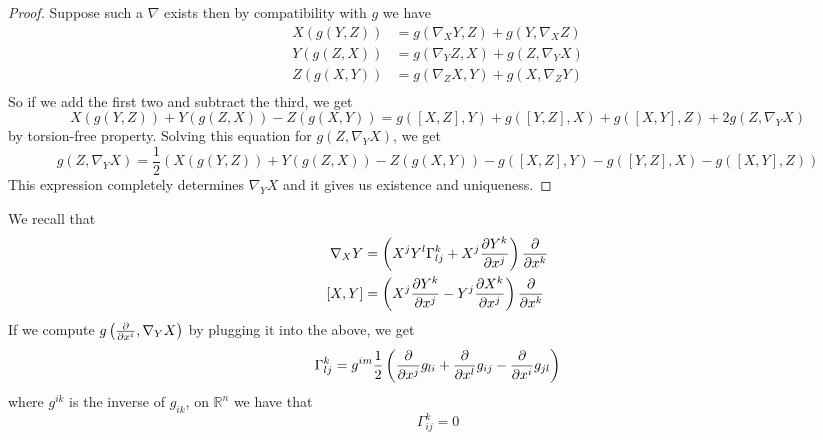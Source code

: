 \documentclass[a4paper]{article}
\begin{document}
\begin{proof}
  Suppose such a $\nabla$ exists then by compatibility with $g$ we have 
  \[
    \begin{aligned}
      X \left( g \left( Y, Z \right) \right) &= g \left( \nabla_X Y, Z \right) + g \left( Y, \nabla_X Z \right) \\
      Y \left( g \left( Z, X \right) \right) &= g \left( \nabla_Y Z, X \right) + g \left( Z, \nabla_Y X \right) \\
      Z \left( g \left( X, Y \right) \right) &= g \left( \nabla_Z X, Y \right) + g \left( X, \nabla_Z Y \right) \\
    \end{aligned}
  \]
  So if we add the first two and subtract the third, we get
  \[
    X(g(Y,Z)) + Y(g(Z,X)) - Z(g(X,Y)) = g([X,Z], Y) + g([Y,Z], X) + g([X,Y],Z) + 2 g (Z, \nabla_Y X)
  \]
  by torsion-free property. Solving this equation for $g(Z, \nabla_Y X)$, we get 
  \[
    g(Z, \nabla_Y X) = \frac{1}{2}  \left( X(g(Y,Z)) + Y(g(Z,X)) - Z(g(X,Y)) - g([X,Z], Y) - g([Y,Z], X) - g([X,Y], Z) \right) 
  \]
  This expression completely determines $\nabla_Y X$ and it gives us existence and uniqueness.
\end{proof}
We recall that
\[
  \begin{aligned}
    \nabla_X Y &= \left(X^jY^l \Gamma_{lj}^k + X^j \pdv{Y^k}{x^j}\right) \pdv{x^k} \\
    [X,Y] &= \left( X^j \pdv{Y^k}{x^j} - Y^j \pdv{X^k}{x^j} \right) \pdv{x^k}
  \end{aligned}
\]
If we compute $g \left( \pdv{x^i}, \nabla_Y X \right)$ by plugging it into the above, we get
\[
  \Gamma_{lj}^k = g^{im} \frac{1}{2} \left( \pdv{x^j}g_{li} + \pdv{x^l}g_{ij} - \pdv{x^i}g_{jl} \right)
\]
where $g^{ik}$ is the inverse of $g_{ik}$, on $\mathds{R}^n$ we have that
\[
  \Gamma_{ij}^k = 0
\]
\end{document}
